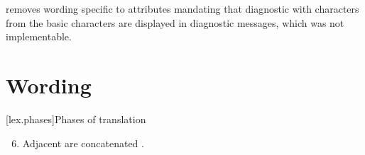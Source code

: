 \documentclass{wg21}
\begin{document}
 removes wording specific to attributes mandating that diagnostic with characters
from the basic characters are displayed in diagnostic messages, which was not implementable.

\section{Wording}



[lex.phases]{Phases of translation}%


\begin{enumerate}
\setcounter{enumi}{5}
\item Adjacent  are concatenated .
\end{enumerate}


%
\end{document}
